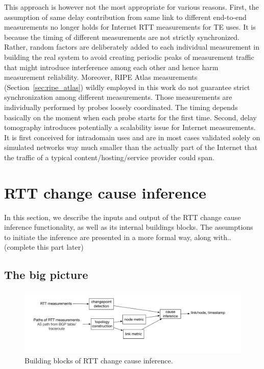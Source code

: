 This approach is however not the most appropriate for various reasons. First, the assumption of
same delay contribution from same link to different end-to-end measurements no longer holds for Internet RTT measurements for TE uses. It is because the timing of different measurements are not strictly synchronized. Rather, random factors are deliberately added to each individual measurement in building the real system to avoid creating periodic peaks of measurement traffic that might introduce interference among each other and hence harm measurement reliability. Moreover,  RIPE Atlas measurements (Section~\ref{sec:ripe_atlas}) wildly employed in this work do not guarantee strict synchronization among different measurements.
Those measurements are individually performed by probes loosely coordinated. The timing depends basically on the moment when each probe starts for the first time.
Second, delay tomography introduces potentially a scalability issue for Internet measurements.
It is first conceived for intradomain uses and are in most cases validated solely on simulated networks way much smaller than the actually part of the Internet that the traffic of a typical content/hosting/service provider could span.

\section{RTT change cause inference}
\label{sec:inference}
In this section, we describe the inputs and output of the RTT change cause inference functionality, as well as its internal buildings blocks. The assumptions to initiate the inference are presented in a more formal way, along with..(complete this part later)
\subsection{The big picture}

\begin{figure}[!htb]
\centering
\includegraphics[width=1.2\textwidth]{gfx/chap5/sys_design.pdf}
\caption{Building blocks of RTT change cause inference.}
\label{fig:chap5_sys_design}
\end{figure}

